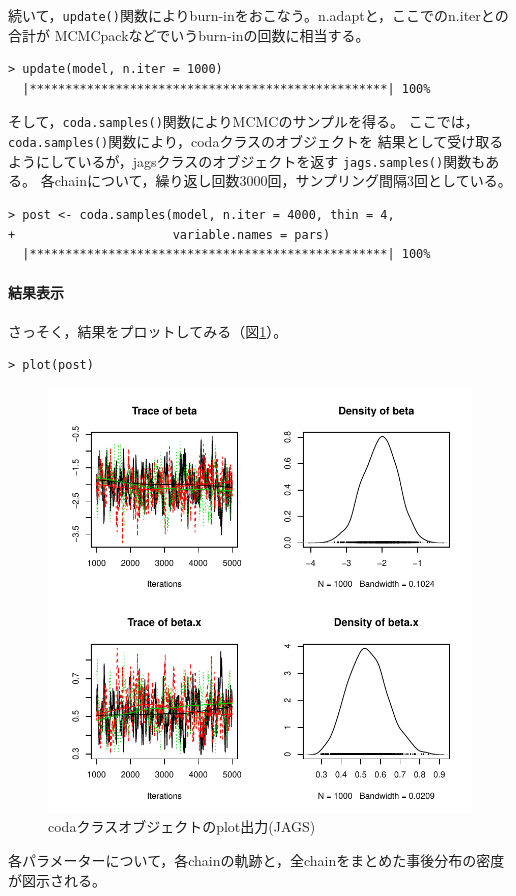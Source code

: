 \documentclass[11pt,uplatex]{jsarticle}
\begin{document}
続いて，\texttt{update()}関数によりburn-inをおこなう。n.adaptと，ここでのn.iterとの合計が
MCMCpackなどでいうburn-inの回数に相当する。

\begin{lstlisting}
> update(model, n.iter = 1000)
  |**************************************************| 100%
\end{lstlisting}

そして，\texttt{coda.samples()}関数によりMCMCのサンプルを得る。
ここでは，\texttt{coda.samples()}関数により，\textsf{coda}クラスのオブジェクトを
結果として受け取るようにしているが，\textsf{jags}クラスのオブジェクトを返す
\texttt{jags.samples()}関数もある。
各chainについて，繰り返し回数3000回，サンプリング間隔3回としている。

\begin{lstlisting}
> post <- coda.samples(model, n.iter = 4000, thin = 4,
+                      variable.names = pars)
  |**************************************************| 100%
\end{lstlisting}


\paragraph{結果表示}

さっそく，結果をプロットしてみる（図\ref{plot_coda}）。
\begin{lstlisting}
> plot(post)
\end{lstlisting}


\begin{figure}[htbp]
	\begin{center}
		\includegraphics[bb=0 0 400 400, clip, width=300 bp]{example2_jags_results.pdf}
	\end{center}
	\caption{\textsf{coda}クラスオブジェクトのplot出力(JAGS)}
	\label{plot_coda}
\end{figure}
\noindent
各パラメーターについて，各chainの軌跡と，全chainをまとめた事後分布の密度が図示される。
\end{document}
